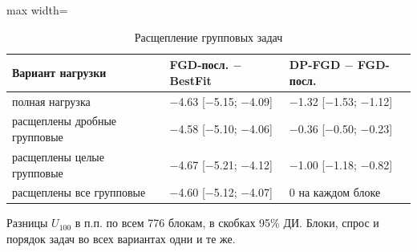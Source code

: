\begin{table}[htbp]
\centering
\small
\caption{Расщепление групповых задач}
\label{tab:f1}
\begin{adjustbox}{max width=\textwidth}
\begin{tabular}{lll}
\toprule
Вариант нагрузки & FGD-посл. \(-\) BestFit & DP-FGD \(-\) FGD-посл. \\
\midrule
полная нагрузка & \(-\)4.63 [\(-\)5.15; \(-\)4.09] & \(-\)1.32 [\(-\)1.53; \(-\)1.12] \\
расщеплены дробные групповые & \(-\)4.58 [\(-\)5.10; \(-\)4.06] & \(-\)0.36 [\(-\)0.50; \(-\)0.23] \\
расщеплены целые групповые & \(-\)4.67 [\(-\)5.21; \(-\)4.12] & \(-\)1.00 [\(-\)1.18; \(-\)0.82] \\
расщеплены все групповые & \(-\)4.60 [\(-\)5.12; \(-\)4.07] & 0 на каждом блоке \\
\bottomrule
\end{tabular}
\end{adjustbox}
\par\smallskip
\parbox{0.95\textwidth}{\footnotesize Разницы \(U_{100}\) в п.п. по всем 776 блокам, в скобках 95\% ДИ. Блоки, спрос и порядок задач во всех вариантах одни и те же.}
\end{table}
